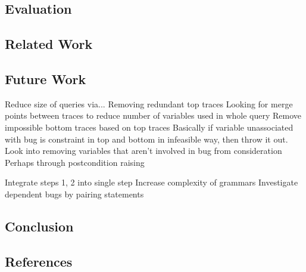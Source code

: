 \documentclass[]{article}
\begin{document}
\subsection{Evaluation}

\subsection{Related Work}

\subsection{Future Work}
Reduce size of queries via...
Removing redundant top traces
Looking for merge points between traces to reduce number of variables used in whole query
Remove impossible bottom traces based on top traces
Basically if variable unassociated with bug is constraint in top and bottom in infeasible way, then throw it out.
Look into removing variables that aren't involved in bug from consideration
Perhaps through postcondition raising

Integrate steps 1, 2 into single step
Increase complexity of grammars
Investigate dependent bugs by pairing statements

\subsection{Conclusion}

\subsection{References}
\end{document}
